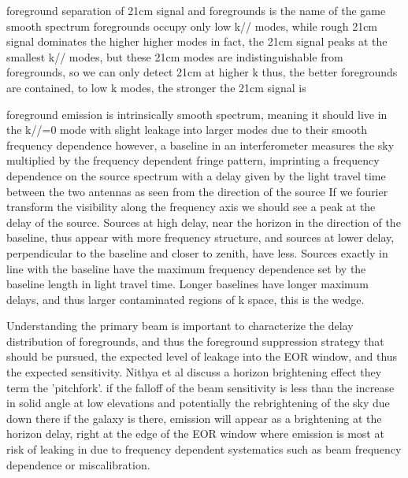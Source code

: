 \documentclass{emulateapj}
\begin{document}
foreground separation of 21cm signal and foregrounds is the name of the game
smooth spectrum foregrounds occupy only low k// modes, while rough 21cm signal dominates the higher higher modes
in fact, the 21cm signal peaks at the smallest k// modes, but these 21cm modes are indistinguishable from foregrounds, so we can only detect 21cm at higher k
thus, the better foregrounds are contained, to low k modes, the stronger the 21cm signal is

foreground emission is intrinsically smooth spectrum, meaning it should live in the k//=0 mode with slight leakage into larger modes due to their smooth frequency dependence
however, a baseline in an interferometer measures the sky multiplied by the frequency dependent fringe pattern, imprinting a frequency dependence on the source spectrum with a delay given by the light travel time between the two antennas as seen from the direction of the source
If we fourier transform the visibility along the frequency axis we should see a peak at the delay of the source. Sources at high delay, near the horizon in the direction of the baseline, thus appear with more frequency structure, and sources at lower delay, perpendicular to the baseline and closer to zenith, have less. Sources exactly in line with the baseline have the maximum frequency dependence set by the baseline length in light travel time. Longer baselines have longer maximum delays, and thus larger contaminated regions of k space, this is the wedge. 

Understanding the primary beam is important to characterize the delay distribution of foregrounds, and thus the foreground suppression strategy that should be pursued, the expected level of leakage into the EOR window, and thus the expected sensitivity. Nithya et al discuss a horizon brightening effect they term the 'pitchfork'. if the falloff of the beam sensitivity is less than the increase in solid angle at low elevations and potentially the rebrightening of the sky due down there if the galaxy is there, emission will appear as a brightening at the horizon delay, right at the edge of the EOR window where emission is most at risk of leaking in due to frequency dependent systematics such as beam frequency dependence or miscalibration. 
\end{document}
